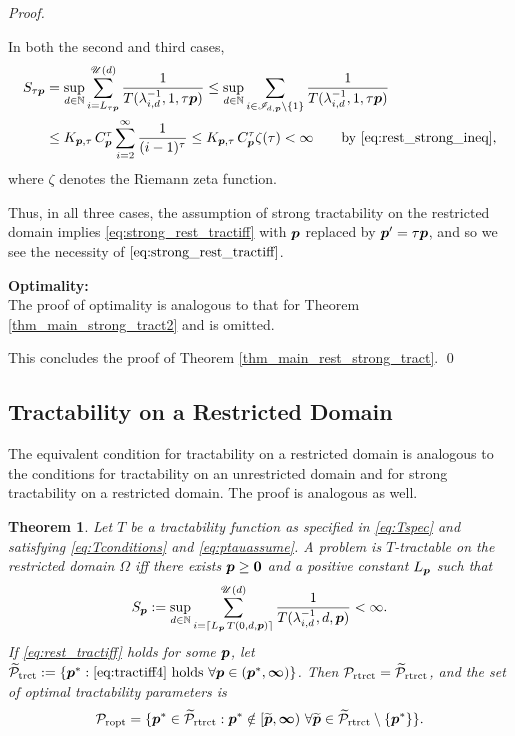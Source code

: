 \documentclass[sort&compress]{elsarticle}
\newcommand{\theUB}{\mathscr{U}}
\newtheorem{theorem}{Theorem}
\begin{document}
\begin{proof}
\begin{enumerate}
\bigskip

In both the second and third cases,
\begin{align*}
S_{\tau\vp} & = \sup_{d\in\naturals} \sum_{i = L_{\tau\vp}}^{\theUB(d)} \frac{1}{T (\lambda_{i,d}^{-1},1, \tau \vp)}
\le
\sup_{d\in\naturals} \sum_{i \in \mathscr{I}_{d,\vp} \setminus\{1\} } \frac{1}{T (\lambda_{i,d}^{-1},1, \tau \vp)} \\
&  \le  K_{\vp,\tau}\, C_{\vp}^\tau
\sum_{i=2}^\infty \frac{1}{(i-1)^\tau}
 \le K_{\vp,\tau}\, C_{\vp}^\tau
\zeta (\tau)
 < \infty \qquad \text{by \eqref{eq:rest_strong_ineq},}
\end{align*}
where $\zeta$ denotes the Riemann zeta function.

\end{enumerate}
Thus, in all three cases, the assumption of strong tractability on the restricted domain implies \eqref{eq:strong_rest_tractiff} with $\boldsymbol{p}$ replaced by $\boldsymbol{p}' = \tau \boldsymbol{p}$, and so we see the necessity of $\eqref{eq:strong_rest_tractiff}$.

\bigskip
\noindent \textbf{Optimality:} \\
The proof of optimality is analogous to that for Theorem \ref{thm_main_strong_tract2} and is omitted.

\bigskip

\noindent This concludes the proof of  Theorem \ref{thm_main_rest_strong_tract}.  \qed
\end{proof}

\subsection{Tractability on a Restricted Domain}


The equivalent condition for tractability on a restricted domain is analogous to the conditions for tractability on an unrestricted domain and for strong tractability on a restricted domain.  The proof is analogous as well.

\begin{theorem}\label{thm_main_rest_tract}
Let $T$ be a tractability function as specified in \eqref{eq:Tspec} and satisfying \eqref{eq:Tconditions} and \eqref{eq:ptauassume}.  A problem is $T$-tractable on the restricted domain $\Omega$ iff there exists $\boldsymbol{p}\ge \boldsymbol{0}$ and a positive constant $L_{\boldsymbol{p}}$ such that
\begin{equation} \label{eq:rest_tractiff}
     S_{\vp}:=\sup_{d \in \naturals}
     \sum_{i = \lceil L_{\vp}\, T(0,d,\vp) \rceil}^{\theUB(d)} \frac{1}{T(\lambda^{-1}_{i,d},d,\vp)}< \infty.
\end{equation}
If \eqref{eq:rest_tractiff} holds for some $\boldsymbol{p}$, let $\widetilde{\mathcal{P}}_{\textup{trct}} : = \{\boldsymbol{p}^* : \eqref{eq:tractiff4} \text{ holds }\forall \boldsymbol{p} \in (\boldsymbol{p}^*,\boldsymbol{\infty}) \}$.
Then $\mathcal{P}_{\textup{rtrct}} = \widetilde{\mathcal{P}}_{\textup{rtrct}}$, and the set of optimal  tractability parameters is
\[
\mathcal{P}_{\textup{ropt}} =
\{\boldsymbol{p}^* \in \widetilde{\mathcal{P}}_{\textup{rtrct}} :  \boldsymbol{p}^* \notin [\widetilde{\boldsymbol{p}},\boldsymbol{\infty}) \ \forall \widetilde{\boldsymbol{p}}\in  \widetilde{\mathcal{P}}_{\textup{rtrct}} \setminus \{\boldsymbol{p}^*\} \}.
\]
\end{theorem}
\end{document}
